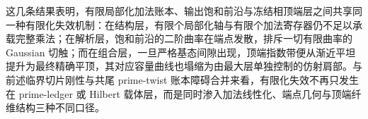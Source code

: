 \noindent
这几条结果表明，有限局部化加法账本、输出饱和前沿与冻结相顶端层之间共享同一种有限化失效机制：在结构层，有限个局部化轴与有限个加法寄存器仍不足以承载完整乘法；在解析层，饱和前沿的二阶曲率在端点发散，排斥一切有限曲率的 Gaussian 切触；而在组合层，一旦严格基态间隙出现，顶端指数带便从渐近平坦提升为最终精确平顶，其对应容量曲线也塌缩为由最大层单独控制的仿射肩部。与前述临界切片刚性与共尾 prime-twist 账本障碍合并来看，有限化失效不再只发生在 prime-ledger 或 Hilbert 载体层，而是同时渗入加法线性化、端点几何与顶端纤维结构三种不同口径。

\endinput
